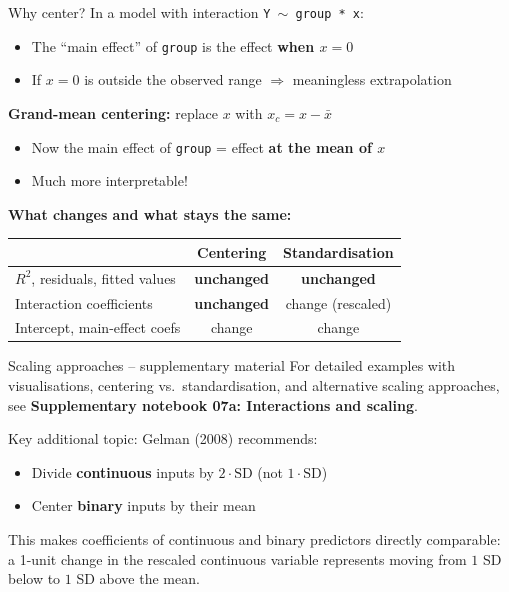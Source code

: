 \documentclass[10pt,ignorenonframetext,aspectratio=169]{beamer}
\begin{document}
\begin{frame}{Why center?}
    In a model with interaction \texttt{Y $\sim$ group * x}:
    \begin{itemize}
        \item The ``main effect'' of \texttt{group} is the effect \textbf{when $x = 0$}
        \item If $x = 0$ is outside the observed range $\Rightarrow$ \alert{meaningless extrapolation}
    \end{itemize}

    \bigskip
    \textbf{Grand-mean centering:} replace $x$ with $x_c = x - \bar{x}$
    \begin{itemize}
        \item Now the main effect of \texttt{group} = effect \textbf{at the mean of $x$}
        \item Much more interpretable!
    \end{itemize}

    \bigskip
    \textbf{What changes and what stays the same:}
    \begin{table}[h]\centering\small
    \begin{tabular}{lcc}
    \hline
    & Centering & Standardisation \\
    \hline
    $R^2$, residuals, fitted values & \textbf{unchanged} & \textbf{unchanged} \\
    Interaction coefficients & \textbf{unchanged} & change (rescaled) \\
    Intercept, main-effect coefs & change & change \\
    \hline
    \end{tabular}
    \end{table}
\end{frame}

\begin{frame}{Scaling approaches -- supplementary material}
    For detailed examples with visualisations, centering vs.\ standardisation, and alternative scaling approaches, see \textbf{Supplementary notebook 07a: Interactions and scaling}.

    \bigskip
    Key additional topic: Gelman (2008) recommends:
    \begin{itemize}
        \item Divide \textbf{continuous} inputs by $2 \cdot \text{SD}$ (not $1 \cdot \text{SD}$)
        \item Center \textbf{binary} inputs by their mean
    \end{itemize}
    This makes coefficients of continuous and binary predictors directly comparable: a 1-unit change in the rescaled continuous variable represents moving from $1$ SD below to $1$ SD above the mean.
\end{frame}
\end{document}

